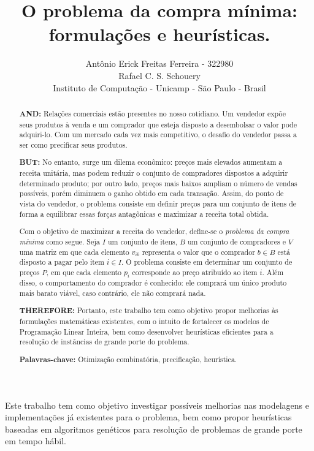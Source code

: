 \documentclass{article}
\title{O problema da compra mínima: formulações e heurísticas.}
\author{Antônio Erick Freitas Ferreira - 322980\\
        Rafael C. S. Schouery \\
        \small Instituto de Computação - Unicamp - São Paulo - Brasil
}
\begin{document}
\maketitle

    \begin{abstract}

        \textbf{AND:} Relações comerciais estão presentes no nosso cotidiano. Um vendedor expõe seus produtos à venda e um comprador que esteja disposto a desembolsar o valor pode adquiri-lo. Com um mercado cada vez mais competitivo, o desafio do vendedor passa a ser como precificar seus produtos.

        \textbf{BUT:} No entanto, surge um dilema econômico: preços mais elevados aumentam a receita unitária, mas podem reduzir o conjunto de compradores dispostos a adquirir determinado produto; por outro lado, preços mais baixos ampliam o número de vendas possíveis, porém diminuem o ganho obtido em cada transação. Assim, do ponto de vista do vendedor, o problema consiste em definir preços para um conjunto de itens de forma a equilibrar essas forças antagônicas e maximizar a receita total obtida.

        Com o objetivo de maximizar a receita do vendedor, define-se o \textit{problema da compra mínima} como segue. Seja $I$ um conjunto de itens, $B$ um conjunto de compradores e $V$ uma matriz em que cada elemento $v_{ib}$ representa o valor que o comprador $b \in B$ está disposto a pagar pelo item $i \in I$. O problema consiste em determinar um conjunto de preços $P$, em que cada elemento $p_i$ corresponde ao preço atribuído ao item $i$. Além disso, o comportamento do comprador é conhecido: ele comprará um único produto mais barato viável, caso contrário, ele não comprará nada.

        \textbf{THEREFORE:} Portanto, este trabalho tem como objetivo propor melhorias às formulações matemáticas existentes, com o intuito de fortalecer os modelos de Programação Linear Inteira, bem como desenvolver heurísticas eficientes para a resolução de instâncias de grande porte do problema.

        \vspace{0.5cm}
        
        \center \textbf{Palavras-chave:} Otimização combinatória, precificação, heurística.
    \end{abstract}

    Este trabalho tem como objetivo investigar possíveis melhorias nas modelagens e implementações já existentes para o problema, bem como propor heurísticas baseadas em algoritmos genéticos para resolução de problemas de grande porte em tempo hábil.
\end{document}
